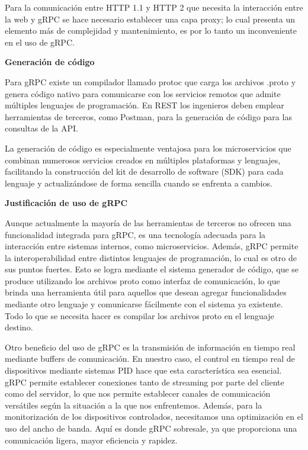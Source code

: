 Para la comunicación entre HTTP 1.1 y HTTP 2 que necesita la interacción entre la web y gRPC se hace necesario establecer una capa proxy; lo cual presenta un elemento más de complejidad y mantenimiento, es por lo tanto un inconveniente en el uso de gRPC.

\textbf{Generación de código}

Para gRPC existe un compilador llamado protoc que carga los archivos .proto y genera código nativo para comunicarse con los servicios remotos que admite múltiples lenguajes de programación. En REST los ingenieros deben emplear herramientas de terceros, como Postman, para la generación de código para las consultas de la API.

La generación de código es especialmente ventajosa para los microservicios que combinan numerosos servicios creados en múltiples plataformas y lenguajes, facilitando la construcción del kit de desarrollo de software (SDK) para cada lenguaje y actualizándose de forma sencilla cuando se enfrenta a cambios.

\textbf{Justificación de uso de gRPC}

Aunque actualmente la mayoría de las herramientas de terceros no ofrecen una funcionalidad integrada para gRPC, es una tecnología adecuada para la interacción entre sistemas internos, como microservicios. Además, gRPC permite la interoperabilidad entre distintos lenguajes de programación, lo cual es otro de sus puntos fuertes. Esto se logra mediante el sistema generador de código, que se produce utilizando los archivos proto como interfaz de comunicación, lo que brinda una herramienta útil para aquellos que desean agregar funcionalidades mediante otro lenguaje y comunicarse fácilmente con el sistema ya existente. Todo lo que se necesita hacer es compilar los archivos proto en el lenguaje destino.

Otro beneficio del uso de gRPC es la transmisión de información en tiempo real mediante buffers de comunicación. En nuestro caso, el control en tiempo real de dispositivos mediante sistemas PID hace que esta característica sea esencial. gRPC permite establecer conexiones tanto de streaming por parte del cliente como del servidor, lo que nos permite establecer canales de comunicación versátiles según la situación a la que nos enfrentemos. Además, para la monitorización de los dispositivos controlados, necesitamos una optimización en el uso del ancho de banda. Aquí es donde gRPC sobresale, ya que proporciona una comunicación ligera, mayor eficiencia y rapidez.


